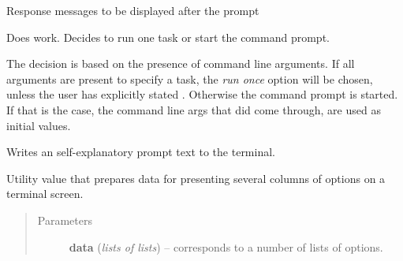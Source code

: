 \documentclass[letterpaper,10pt,english]{sphinxmanual}
\begin{document}
\begin{fulllineitems}
\begin{fulllineitems}
\begin{quote}
\begin{description}
\end{description}\end{quote}

\end{fulllineitems}


\begin{fulllineitems}
\label{graf/graf:graf.shell.Shell.message}
Response messages to be displayed after the prompt

\end{fulllineitems}


\begin{fulllineitems}
\label{graf/graf:graf.shell.Shell.processor}
Does work. Decides to run one task or start the command prompt.

The decision is based on the presence of command line arguments.
If all arguments are present to specify a task, the \emph{run once} option will be chosen,
unless the user has explicitly stated .
Otherwise the command prompt is started. If that is the case, the
command line args that did come through, are used as initial values.

\end{fulllineitems}


\begin{fulllineitems}
\label{graf/graf:graf.shell.Shell.prompt}
Writes an self-explanatory prompt text to the terminal.

\end{fulllineitems}


\begin{fulllineitems}
\label{graf/graf:graf.shell.Shell.weave}
Utility value that prepares data for presenting several columns of options
on a terminal screen.
\begin{quote}\begin{description}
\item[{Parameters}] \leavevmode
\textbf{data} (\emph{lists of lists}) --
corresponds to a number of lists of options.


\end{description}
\end{quote}
\end{fulllineitems}
\end{fulllineitems}
\end{document}
